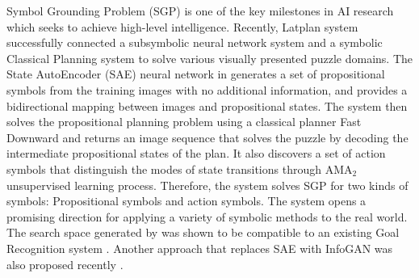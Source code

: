 Symbol Grounding Problem (SGP) \cite{harnad1990symbol,Steels2008} is one of the key milestones in AI research
which seeks to achieve high-level intelligence.
% 
% 
Recently, Latplan system \cite[]{Asai2018} successfully
connected a subsymbolic neural network system and a symbolic Classical Planning system
to solve various visually presented puzzle domains.
The State AutoEncoder (SAE) neural network in \latentplanner
generates a set of propositional symbols from the training images with no additional information,
and provides a bidirectional mapping between images and propositional states.
% 
The system then solves the propositional planning problem using a classical planner Fast Downward \cite{Helmert04}
and returns an image sequence that solves the puzzle
by decoding the intermediate propositional states of the plan.
It also discovers a set of action symbols that distinguish the modes of
state transitions through AMA$_2$ unsupervised learning process.
Therefore, the system solves SGP for two kinds of symbols:
Propositional symbols and action symbols.
% 
The system opens a promising direction for applying a variety of symbolic methods to the real world.
The search space generated by \latentplanner was shown to be compatible
to an existing Goal Recognition system \cite{amado2018goal}.
Another approach that replaces SAE with InfoGAN was also proposed recently \cite{kurutach2018learning}.

